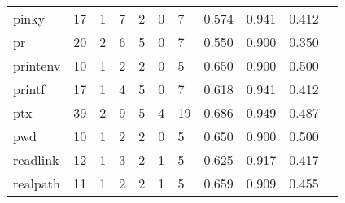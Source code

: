 \begin{longtable}{lp{1.10cm}p{1.10cm}p{1.10cm}p{1.10cm}p{1.10cm}p{1.10cm}p{1.10cm}p{1.10cm}p{1.10cm}p{1.10cm}}
pinky     &                     17 &                                  1 &                                 7 &                                2 &                                 0 &                               7 &                          0.574 &                                 0.941 &                               0.412 \\
pr        &                     20 &                                  2 &                                 6 &                                5 &                                 0 &                               7 &                          0.550 &                                 0.900 &                               0.350 \\
printenv  &                     10 &                                  1 &                                 2 &                                2 &                                 0 &                               5 &                          0.650 &                                 0.900 &                               0.500 \\
printf    &                     17 &                                  1 &                                 4 &                                5 &                                 0 &                               7 &                          0.618 &                                 0.941 &                               0.412 \\
ptx       &                     39 &                                  2 &                                 9 &                                5 &                                 4 &                              19 &                          0.686 &                                 0.949 &                               0.487 \\
pwd       &                     10 &                                  1 &                                 2 &                                2 &                                 0 &                               5 &                          0.650 &                                 0.900 &                               0.500 \\
readlink  &                     12 &                                  1 &                                 3 &                                2 &                                 1 &                               5 &                          0.625 &                                 0.917 &                               0.417 \\
realpath  &                     11 &                                  1 &                                 2 &                                2 &                                 1 &                               5 &                          0.659 &                                 0.909 &                               0.455 \\

\end{longtable}
